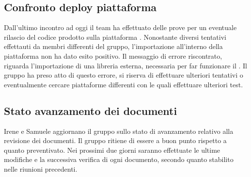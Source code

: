 \subsection{Confronto deploy piattaforma }
Dall'ultimo incontro ad oggi il team ha effettuato delle prove per un eventuale rilascio del codice prodotto sulla piattaforma . Nonostante diversi tentativi effettauti da membri differenti del gruppo, l'importazione all'interno della piattaforma non ha dato esito positivo. Il messaggio di errore riscontrato, riguarda l'importazione di una libreria esterna, necessaria per far funzionare il . 
Il gruppo ha preso atto di questo errore, si riserva di effettuare ulteriori tentativi o eventualmente cercare piattaforme differenti con le quali effettuare ulteriori test. 

\newpage
\subsection{Stato avanzamento dei documenti}
Irene e Samuele aggiornano il gruppo sullo stato di avanzamento relativo alla revisione dei documenti. Il gruppo ritiene di essere a buon punto rispetto a quanto preventivato. Nei prossimi due giorni saranno effettuate le ultime modifiche e la successiva verifica di ogni documento, secondo quanto stabilito nelle riunioni precedenti. 

